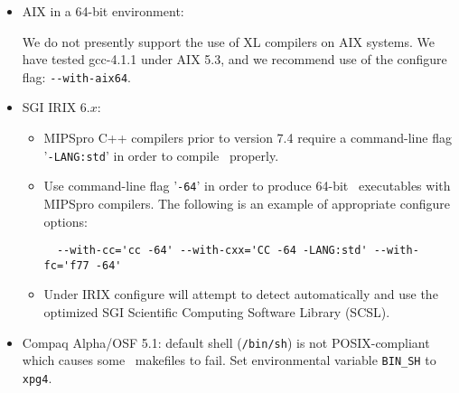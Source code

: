 \documentclass[12pt]{article}
\begin{document}
\begin{itemize}
\begin{itemize}
      {\tt -}{\tt -with-blas='-altivec -framework vecLib'} {\tt -}{\tt
        -with-lapack=' '}

  \item Pre Mac OS 10.4: Certain PSI4 codes require significant
      stackspace for compilation.  Increase your shell's stacksize
      limit before running {\tt make}.  For csh, for example, this is
      done using ``unlimit stacksize.''  [NB: This limit appears to have
      been lifted starting with Mac OS 10.3.X (Panther).]

  \end{itemize}

\item AIX in a 64-bit environment:

We do not presently support the use of XL compilers on AIX systems.  We 
have tested gcc-4.1.1 under AIX 5.3, and we recommend use of the 
configure flag: {\tt -}{\tt -with-aix64}.


\item SGI IRIX 6.$x$:
  \begin{itemize}
   \item MIPSpro C++ compilers prior to version 7.4 require a command-line flag
   '{\tt -LANG:std}' in order to compile \PSIfour\ properly.

   \item Use command-line flag '{\tt -64}' in order to produce 64-bit
\PSIfour\ executables with
   MIPSpro compilers. The following is an example of appropriate configure options:
   \begin{verbatim}
  --with-cc='cc -64' --with-cxx='CC -64 -LANG:std' --with-fc='f77 -64'
   \end{verbatim}

   \item Under IRIX configure will attempt to detect automatically and use
   the optimized SGI Scientific Computing Software Library (SCSL).
  \end{itemize}

\item Compaq Alpha/OSF 5.1: default shell ({\tt /bin/sh})
is not POSIX-compliant which causes some \PSIfour\ makefiles
to fail. Set environmental variable {\tt BIN\_SH} to {\tt xpg4}.

\end{itemize}
\end{document}
